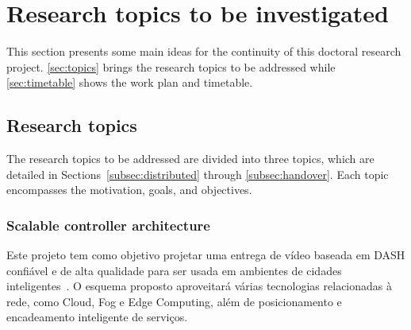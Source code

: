 \clearpage
\section{Research topics to be investigated}
\label{ch:proposal}

This section presents some main ideas for the continuity of this doctoral
research project. \autoref{sec:topics} brings the research topics to be
addressed while \autoref{sec:timetable} shows the work plan and timetable.

\subsection{Research topics}
\label{sec:topics}

The research topics to be addressed are divided into three topics, which are
detailed in Sections~\ref{subsec:distributed} through \ref{subsec:handover}.
Each topic encompasses the motivation, goals, and objectives.

\subsubsection{Scalable controller architecture}
\label{subsec:}

Este projeto tem como objetivo projetar uma entrega de vídeo baseada em DASH confiável e de alta qualidade para ser usada em ambientes de cidades inteligentes~\cite{gamaUCC2019, KreuzbergerWorkshop2016}. O esquema proposto aproveitará várias tecnologias relacionadas à rede, como Cloud, Fog e Edge Computing, além de posicionamento e encadeamento inteligente de serviços.%


